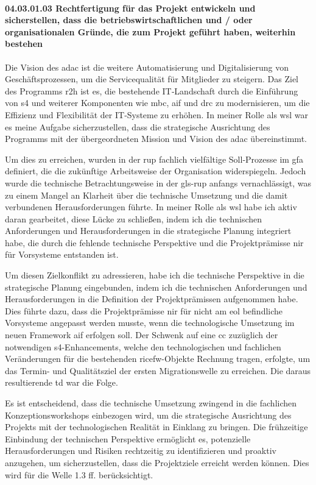 \paragraph*{04.03.01.03 Rechtfertigung für das Projekt entwickeln und sicherstellen, dass die betriebswirtschaftlichen und / oder organisationalen Gründe, die zum Projekt geführt haben, weiterhin bestehen}

\par Die Vision des \gls{adac} ist die weitere Automatisierung und Digitalisierung von Geschäftsprozessen, um die Servicequalität für Mitglieder zu steigern. Das Ziel des Programms \gls{r2h} ist es, die bestehende IT‑Landschaft durch die Einführung von \gls{s4} und weiterer Komponenten wie \gls{mbc}, \gls{aif} und \gls{drc} zu modernisieren, um die Effizienz und Flexibilität der IT‑Systeme zu erhöhen. In meiner Rolle als \gls{wsl} war es meine Aufgabe sicherzustellen, dass die strategische Ausrichtung des Programms mit der übergeordneten Mission und Vision des \gls{adac} übereinstimmt.

\par Um dies zu erreichen, wurden in der \gls{rup} fachlich vielfältige Soll‑Prozesse im \gls{gfa} definiert, die die zukünftige Arbeitsweise der Organisation widerspiegeln. Jedoch wurde die technische Betrachtungsweise in der \gls{gls-rup} anfangs vernachlässigt, was zu einem Mangel an Klarheit über die technische Umsetzung und die damit verbundenen Herausforderungen führte. In meiner Rolle als \gls{wsl} habe ich aktiv daran gearbeitet, diese Lücke zu schließen, indem ich die technischen Anforderungen und Herausforderungen in die strategische Planung integriert habe, die durch die fehlende technische Perspektive und die Projektprämisse \gls{nir} für Vorsysteme entstanden ist.

\par Um diesen Zielkonflikt zu adressieren, habe ich die technische Perspektive in die strategische Planung eingebunden, indem ich die technischen Anforderungen und Herausforderungen in die Definition der Projektprämissen aufgenommen habe. Dies führte dazu, dass die Projektprämisse \gls{nir} für nicht am \gls{eol} befindliche Vorsysteme angepasst werden musste, wenn die technologische Umsetzung im neuen Framework \gls{aif} erfolgen soll. Der Schwenk auf eine \gls{cc} zuzüglich der notwendigen \gls{s4}-Enhancements, welche den technologischen und fachlichen Veränderungen für die bestehenden \gls{ricefw}-Objekte Rechnung tragen, erfolgte, um das Termin- und Qualitätsziel der ersten Migrationswelle zu erreichen. Die daraus resultierende \gls{td} war die Folge.

\par Es ist entscheidend, dass die technische Umsetzung zwingend in die fachlichen Konzeptionsworkshops einbezogen wird, um die strategische Ausrichtung des Projekts mit der technologischen Realität in Einklang zu bringen. Die frühzeitige Einbindung der technischen Perspektive ermöglicht es, potenzielle Herausforderungen und Risiken rechtzeitig zu identifizieren und proaktiv anzugehen, um sicherzustellen, dass die Projektziele erreicht werden können. Dies wird für die Welle 1.3 ff. berücksichtigt.
